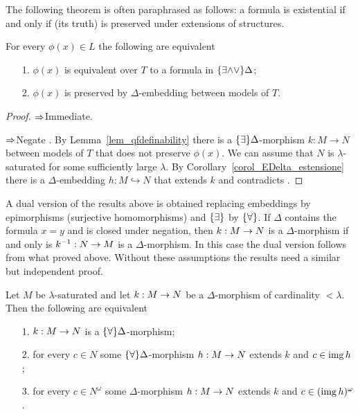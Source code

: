 The following theorem is often paraphrased as follows: a formula is existential if and only if (its truth) is preserved under extensions of structures.

\begin{theorem}\label{thm_embeddings_preservation_E}
For every $\phi(x)\in L$ the following are equivalent
\begin{itemize}
\item[1.] $\phi(x)$ is equivalent over $T$ to a formula in $\{\exists{\wedge}{\vee}\}\Delta$;
\item[2.] $\phi(x)$ is preserved by $\Delta$-embedding between models of $T$.
\end{itemize}
\end{theorem}
\begin{proof}
$\Rightarrow$\quad Immediate. 

$\Rightarrow$\quad Negate . By Lemma~\ref{lem_qfdefinability} there is a $\{\exists\}\Delta$-morphism $k:M\to N$ between models of $T$ that does not preserve $\phi(x)$. We can assume that $N$ is $\lambda$-saturated for some sufficiently large $\lambda$. By Corollary~\ref{corol_EDelta_estensione} there is a $\Delta$-embedding $h:M\hookrightarrow N$ that extends $k$ and contradicts .
\end{proof}

A dual version of the results above is obtained replacing embeddings by epimorphisms (surjective homomorphisms) and $\{\exists\}$ by $\{\forall\}$. If $\Delta$ contains the formula $x=y$ and is closed under negation, then $k:M\rightarrow N$ is a $\Delta$-morphism if and only is $k^{-1}:N\rightarrow M$ is a $\Delta$-morphism. In this case the dual version follows from what proved above. Without these assumptions the results need a similar but independent proof.

\begin{proposition}\label{prop_ADelta_estensione}
Let $M$ be $\lambda$-saturated and let $k:M\rightarrow N$ be a $\Delta$-morphism of cardinality $<\lambda$. Then the following are equivalent
\begin{itemize}
\item[1.] $k:M\rightarrow N$ is a $\{\forall\}\Delta$-morphism;
\item[2.] for every $c\in N$ some $\{\forall\}\Delta$-morphism $h:M\rightarrow N$ extends $k$ and $c\in\mathop{\rm img} h$;
\item[3.] for every $c\in N^{\omega}$ some $\Delta$-morphism $h:M\rightarrow N$ extends $k$ and $c\in(\mathop{\rm img} h)^{\omega}$.
\end{itemize}
\end{proposition}

